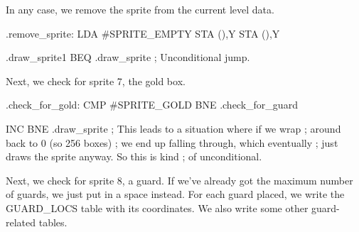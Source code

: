 \documentclass[10pt]{report}%
\begin{document}
In any case, we remove the sprite from the current level data.

\nwenddocs{}\plusendmoddef\nwstartdeflinemarkup{}\nwenddeflinemarkup
.remove_sprite:
    LDA     #SPRITE_EMPTY
    STA     (),Y
    STA     (),Y

.draw_sprite1
    BEQ     .draw_sprite        ; Unconditional jump.
\nwendcode{}\nwdocspar

Next, we check for sprite 7, the gold box.

\nwenddocs{}\plusendmoddef\nwstartdeflinemarkup{}\nwenddeflinemarkup
.check_for_gold:
    CMP      #SPRITE_GOLD
    BNE     .check_for_guard

    INC     
    BNE     .draw_sprite        ; This leads to a situation where if we wrap
                                ;  around back to 0 (so 256 boxes)
                                ; we end up falling through, which eventually
                                ; just draws the sprite anyway. So this is kind
                                ; of unconditional.

\nwendcode{}\nwdocspar

Next, we check for sprite 8, a guard. If we've already
got the maximum number of guards, we just put in a space instead. For each guard placed, we
write the {\Tt{}GUARD{\_}LOCS\nwendquote} table with its coordinates. We also write some other guard-related
tables.
\end{document}
